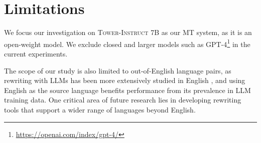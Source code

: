 \section{Limitations}


We focus our investigation on \textsc{Tower-Instruct 7B} as our MT system, as it is an open-weight model. We exclude closed and larger models such as \textsc{GPT-4}\footnote{\url{https://openai.com/index/gpt-4/}} in the current experiments.

The scope of our study is also limited to out-of-English language pairs, as rewriting with LLMs has been more extensively studied in English \citep{ma-etal-2023-query, ye-etal-2023-enhancing, shu2023rewritelm, mao2024rafe}, and using English as the source language benefits performance from its prevalence in LLM training data. One critical area of future research lies in developing rewriting tools that support a wider range of languages beyond English. 


